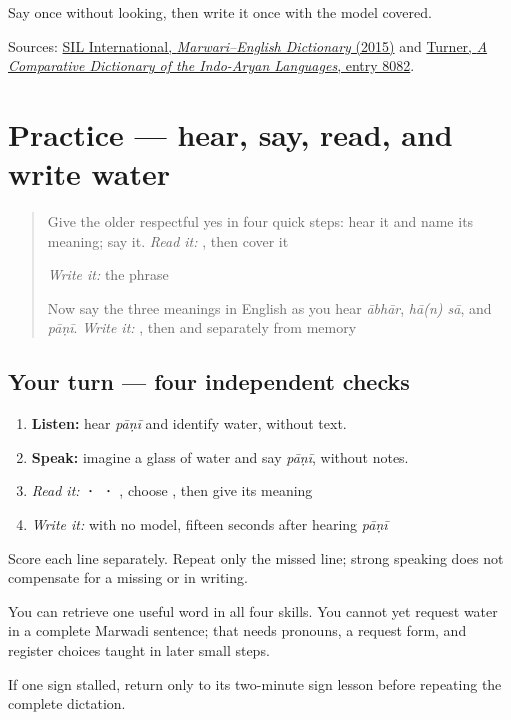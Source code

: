 \begin{tcolorbox}[breakable,colback=teal!4,colframe=teal!35!black,title={Before you move on}]
Say \textbf{} once without looking, then write it once with the model covered.

Sources: \href{https://nepal.sil.org/resources/archives/63768}{SIL International, \emph{Marwari–English Dictionary} (2015)} and \href{https://dsal.uchicago.edu/dictionaries/soas/}{Turner, \emph{A Comparative Dictionary of the Indo-Aryan Languages}, entry 8082}.
\end{tcolorbox}
\section[Practice]{Practice — hear, say, read, and write water}

\label{lesson:MW-C04-practice}



\begin{quote}
Give the older respectful yes in four quick steps: hear it and name its meaning; say it. \emph{Read it:} \textbf{ }, then cover it

\emph{Write it:} the phrase

Now say the three meanings in English as you hear \emph{ābhār}, \emph{hā(n) sā}, and \emph{pāṇī}. \emph{Write it:} \textbf{}, then \textbf{} and \textbf{} separately from memory
\end{quote}

\subsection*{Your turn — four independent checks}
\begin{enumerate}
\raggedright
  \item \textbf{Listen:} hear \emph{pāṇī} and identify water, without text.
  \item \textbf{Speak:} imagine a glass of water and say \emph{pāṇī}, without notes.
  \item \emph{Read it:} \textbf{ ·  · }, choose \textbf{}, then give its meaning
  \item \emph{Write it:} \textbf{} with no model, fifteen seconds after hearing \emph{pāṇī}
\end{enumerate}

Score each line separately. Repeat only the missed line; strong speaking does not compensate for a missing \textbf{} or \textbf{} in writing.

\begin{grammarlens}[title={What you've built — and what remains}]
You can retrieve one useful word in all four skills. You cannot yet request water in a complete Marwadi sentence; that needs pronouns, a request form, and register choices taught in later small steps.
\end{grammarlens}

\begin{tcolorbox}[breakable,colback=teal!4,colframe=teal!35!black,title={Before you move on}]
If one sign stalled, return only to its two-minute sign lesson before repeating the complete dictation.
\end{tcolorbox}
